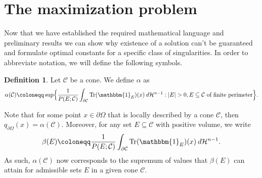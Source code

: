 \documentclass[artcle, 11pt, reqno]{amsart}
\numberwithin{equation}{section}
\newcommand{\Hd}{\mathcal{H}}
\newcommand{\pom}{{\partial \Omega}}
\newcommand{\ind}{\mathbbm{1}}
\newcommand{\C}{\mathcal{C}}
\newcommand{\dd}{\: d}
\DeclareMathOperator{\Tr}{Tr}
\theoremstyle{plain}
\theoremstyle{definition}
\newtheorem{definition}[theorem]{Definition}
\theoremstyle{remark}
\begin{document}
	
	
	
	
	\section{The maximization problem} 
	Now that we have established the required mathematical language and preliminary results we can show why existence of a solution can't be guaranteed and formulate optimal constants for a specific class of singularities. In order to abbreviate notation, we will define the following symbols.
	\begin{definition} \label{def:alpha}
		Let $\C$ be a cone. We define $\alpha$ as
		\[ 
		\alpha(\C) \coloneqq \sup \Bigl\{ \frac{1}{P(E;\C)} \int_{\partial \C} \Tr(\ind_E)(x) \dd \Hd^{n-1} : |E| > 0, E \subseteq \C \text{ of finite perimeter} \Bigr\}.
		\]
	\end{definition}
	Note that for some point $x \in \pom$ that is locally described by a cone $\mathcal{C}$, then $q_\pom(x) = \alpha(\mathcal{C})$.
	Moreover, for any set $E \subseteq \C$ with positive volume, we write
	\[
	\beta(E) \coloneqq  \frac{1}{P(E;\C)} \int_{\partial \C} \Tr(\ind_E)(x) \dd\Hd^{n-1}.
	\]
	As such, $\alpha(\mathcal{C})$ now corresponds to the supremum of values that $\beta(E)$ can attain for admissible sets $E$ in a given cone $\C$.
	
\end{document}
